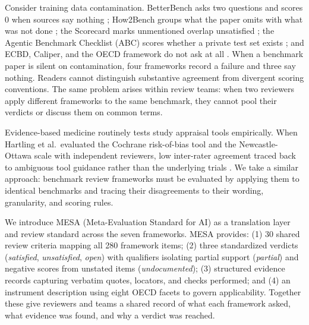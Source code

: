 \documentclass[10pt,conference]{IEEEtran}
\begin{document}
Consider training data contamination. BetterBench asks two questions and scores 0 when sources say nothing \cite{reuel_betterbench}; How2Bench groups what the paper omits with what was not done \cite{cao_how2bench_2025}; the Scorecard marks unmentioned overlap unsatisfied \cite{san_joaquin_scorecard_2026}; the Agentic Benchmark Checklist (ABC) scores whether a private test set exists \cite{zhu_agentic_benchmark_checklist_2025}; and ECBD, Caliper, and the OECD framework do not ask at all \cite{liu_ecbd_2024,corona_benchmark_caliper_2026,cohn_hernandez_orallo_oecd_2023}. When a benchmark paper is silent on contamination, four frameworks record a failure and three say nothing. Readers cannot distinguish substantive agreement from divergent scoring conventions. The same problem arises within review teams: when two reviewers apply different frameworks to the same benchmark, they cannot pool their verdicts or discuss them on common terms.

Evidence-based medicine routinely tests study appraisal tools empirically. When Hartling et al.\ evaluated the Cochrane risk-of-bias tool and the Newcastle-Ottawa scale with independent reviewers, low inter-rater agreement traced back to ambiguous tool guidance rather than the underlying trials \cite{hartling_rand_2012}. We take a similar approach: benchmark review frameworks must be evaluated by applying them to identical benchmarks and tracing their disagreements to their wording, granularity, and scoring rules.

We introduce MESA (Meta-Evaluation Standard for AI) as a translation layer and review standard across the seven frameworks. MESA provides: (1) 30 shared review criteria mapping all 280 framework items; (2) three standardized verdicts (\emph{satisfied}, \emph{unsatisfied}, \emph{open}) with qualifiers isolating partial support (\emph{partial}) and negative scores from unstated items (\emph{undocumented}); (3) structured evidence records capturing verbatim quotes, locators, and checks performed; and (4) an instrument description using eight OECD facets \cite{cohn_hernandez_orallo_oecd_2023} to govern applicability. Together these give reviewers and teams a shared record of what each framework asked, what evidence was found, and why a verdict was reached.
\end{document}
